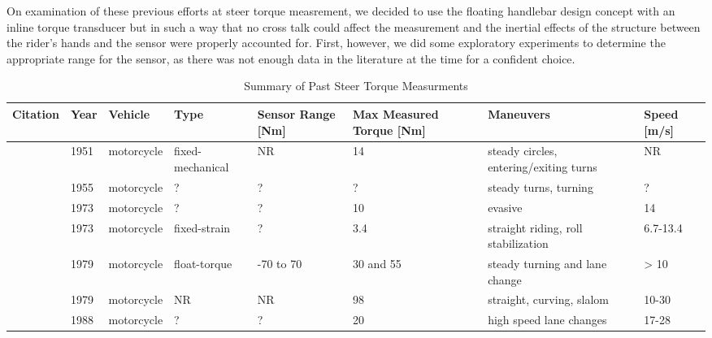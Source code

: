 \documentclass[10pt]{article}
\begin{document}

On examination of these previous efforts at steer torque measrement, we decided to use the
floating handlebar design concept with an inline torque transducer but in such a way
that no cross talk could affect the measurement and the inertial effects of the
structure between the rider's hands and the sensor were properly accounted for.
First, however, we did some exploratory experiments to determine the appropriate
range for the sensor, as there was not enough data in the literature at the time
for a confident choice.

\begin{landscape}
\begin{table}
  \caption{Summary of Past Steer Torque Measurments}
  \small
  \begin{tabular}{llllllll}
    \toprule
    Citation                              &  Year &     Vehicle &              Type & Sensor Range [Nm] & Max Measured Torque [Nm] &                               Maneuvers & Speed [m/s] \\
    \midrule
    \cite{Wilson-Jones1951}               &  1951 &  motorcycle &  fixed-mechanical &                NR &                       14 &  steady circles, entering/exiting turns &          NR \\
    \cite{Kondo1955}                      &  1955 &  motorcycle &                 ? &                 ? &                        ? &                   steady turns, turning &           ? \\
    \cite{Watanabe1973}                   &  1973 &  motorcycle &                 ? &                 ? &                       10 &                                 evasive &          14 \\
    \cite{Eaton1973}                      &  1973 &  motorcycle &      fixed-strain &                 ? &                      3.4 &     straight riding, roll stabilization &    6.7-13.4 \\
    \cite{Weir1979a}                      &  1979 &  motorcycle &      float-torque &         -70 to 70 &                30 and 55 &          steady turning and lane change &        > 10 \\
    \cite{Aoki1979}                       &  1979 &  motorcycle &                NR &                NR &                       98 &               straight, curving, slalom &       10-30 \\
    \cite{Sugizaki1988}                   &  1988 &  motorcycle &                 ? &                 ? &                       20 &                 high speed lane changes &       17-28 \\

\end{tabular}
\end{table}
\end{landscape}
\end{document}
